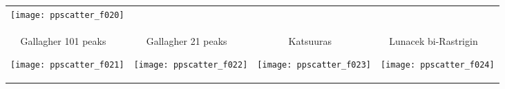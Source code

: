 \documentclass[sigconf]{acmart}
\begin{document}
\begin{figure*}
\begin{tabular}{*{4}{@{}c@{}}}
    \texttt{[image: ppscatter\_f020]}\\[-2.2ex]
\begin{turn}{90}\parbox{0.21\textwidth}{\hfill{} Gallagher 101 peaks \hfill~}\end{turn} 
    \texttt{[image: ppscatter\_f021]}&
\begin{turn}{90}\parbox{0.21\textwidth}{\hfill{} Gallagher 21 peaks \hfill~}\end{turn} 
    \texttt{[image: ppscatter\_f022]}&
\begin{turn}{90}\parbox{0.21\textwidth}{\hfill{} Katsuuras \hfill~}\end{turn} 
    \texttt{[image: ppscatter\_f023]}&
\begin{turn}{90}\parbox{0.21\textwidth}{\hfill{} Lunacek bi-Rastrigin \hfill~}\end{turn} 
    \texttt{[image: ppscatter\_f024]}
\end{tabular}
\caption{\label{fig:scatterplots}
}
\end{figure*}


 
\end{document}

